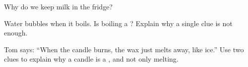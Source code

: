 \begin{exercise}[$\star$]\label{exo:g5:irreversible-changes:9}
Why do we keep milk in the fridge?
\end{exercise}

\begin{exercise}[$\star\star$]\label{exo:g5:irreversible-changes:10}
Water bubbles when it boils. Is boiling a ? Explain why a
single clue is not enough.
\end{exercise}

\begin{exercise}[$\star\star$]\label{exo:g5:irreversible-changes:11}
Tom says: ``When the candle burns, the wax just melts away, like ice.''
Use two clues to explain why  a candle is a , and
not only melting.
\end{exercise}
